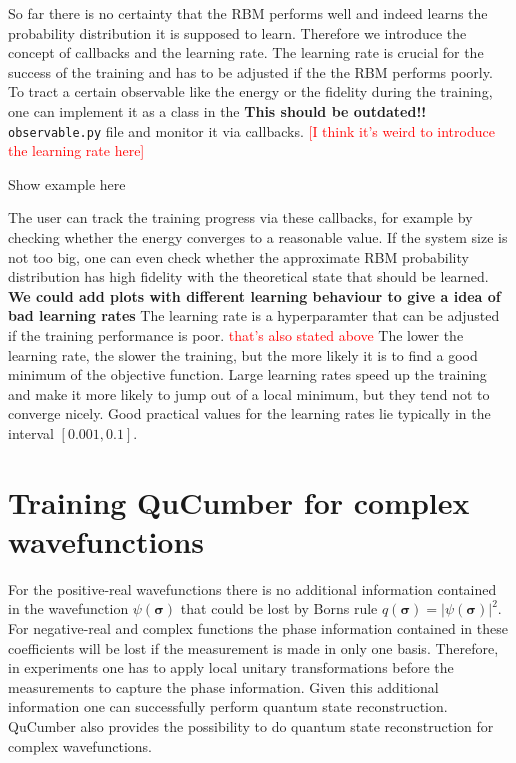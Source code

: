 \documentclass[submission, Phys]{SciPost}
\begin{document}
So far there is no certainty that the RBM performs well and indeed learns the probability distribution it is supposed to learn. 
Therefore we introduce the concept of callbacks and the learning rate. The learning rate is crucial for the success of the training 
and has to be adjusted if the the RBM performs poorly.
To tract a certain observable like the energy or the fidelity during the training, one can implement it as a class in the \textbf{This should be outdated!!} \verb|observable.py| file and monitor it via callbacks.
\textcolor{red}{[I think it's weird to introduce the learning rate here]}

\begin{python}
Show example here
\end{python}

The user can track the training progress via these callbacks, for example by checking whether the energy converges to a reasonable value. 
If the system size is not too big, one can even check whether the approximate RBM probability distribution has high fidelity with the theoretical state that should be learned.
\textbf{We could add plots with different learning behaviour to give a idea of bad learning rates}
The learning rate is a hyperparamter that can be adjusted if the training performance is poor. \textcolor{red}{that's also stated above}
The lower the learning rate, the slower the training, but the more likely it is to find a good minimum of the objective function. 
Large learning rates speed up the training and make it more likely to jump out of a local minimum, but they tend not to converge nicely. 
Good practical values for the learning rates lie typically in the interval $[0.001, 0.1]$.

\section{Training QuCumber for complex wavefunctions}
\label{Sec:Training_QuCumber_on_complex_wavefunctions}

For the positive-real wavefunctions there is no additional information contained in the wavefunction 
$\psi( \boldsymbol{\sigma})$ that could be lost by Borns rule $q(\boldsymbol{\sigma}) = | \psi( \boldsymbol{\sigma} ) |^2$. 
For negative-real and complex functions the phase information contained in these coefficients will be lost if the measurement 
is made in only one basis. Therefore, in experiments one has to apply local unitary transformations before the measurements 
to capture the phase information. Given this additional information one can successfully perform quantum state reconstruction.
QuCumber also provides the possibility to do quantum state reconstruction for complex wavefunctions.
\end{document}
